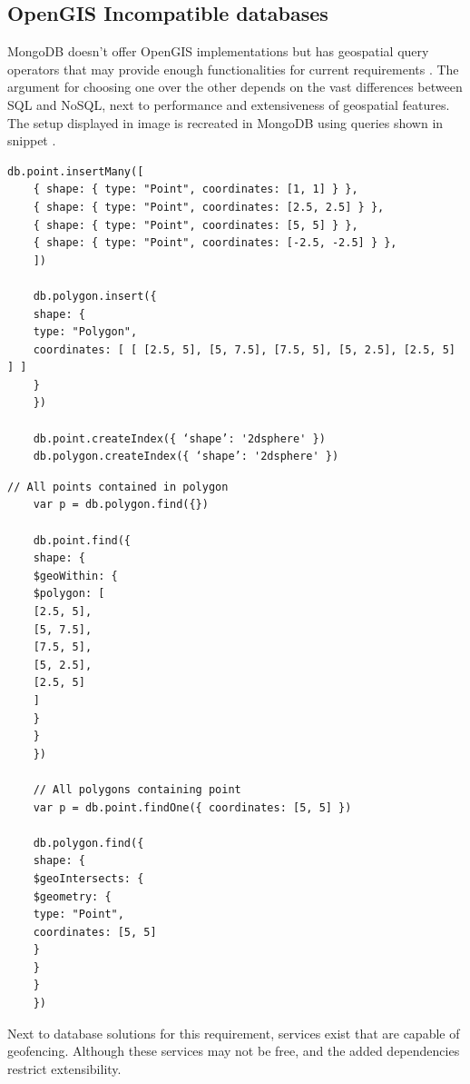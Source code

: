 \subsection{OpenGIS Incompatible databases}
MongoDB doesn’t offer OpenGIS implementations but has geospatial query operators that may provide enough functionalities for current requirements . The argument for choosing one over the other depends on the vast differences between SQL and NoSQL, next to performance and extensiveness of geospatial features. The setup displayed in image  is recreated in MongoDB using queries shown in snippet .

\begin{Verbatim}[fontsize=\scriptsize]
	db.point.insertMany([
	{ shape: { type: "Point", coordinates: [1, 1] } },
	{ shape: { type: "Point", coordinates: [2.5, 2.5] } },
	{ shape: { type: "Point", coordinates: [5, 5] } },
	{ shape: { type: "Point", coordinates: [-2.5, -2.5] } },
	])

	db.polygon.insert({
	shape: {
	type: "Polygon",
	coordinates: [ [ [2.5, 5], [5, 7.5], [7.5, 5], [5, 2.5], [2.5, 5] ] ]
	}
	})

	db.point.createIndex({ ‘shape’: '2dsphere' })
	db.polygon.createIndex({ ‘shape’: '2dsphere' })
\end{Verbatim}

\begin{Verbatim}[fontsize=\scriptsize]
	// All points contained in polygon
	var p = db.polygon.find({})

	db.point.find({
	shape: {
	$geoWithin: {
	$polygon: [
	[2.5, 5],
	[5, 7.5],
	[7.5, 5],
	[5, 2.5],
	[2.5, 5]
	]
	}
	}
	})

	// All polygons containing point
	var p = db.point.findOne({ coordinates: [5, 5] })

	db.polygon.find({
	shape: {
	$geoIntersects: {
	$geometry: {
	type: "Point",
	coordinates: [5, 5]
	}
	}
	}
	})
\end{Verbatim}

Next to database solutions for this requirement, services exist that are capable of geofencing. Although these services may not be free, and the added dependencies restrict extensibility.

%
